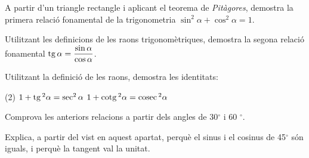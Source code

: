 \begin{mylist}
	\exer
	A partir d'un triangle rectangle i aplicant el teorema de \emph{Pitàgores}, demostra la primera relació fonamental de la trigonometria $\sin^2 \alpha + \cos^2 \alpha = 1$.
	
 	
	\exer
	Utilitzant les definicions de les raons trigonomètriques, demostra la
	segona relació fonamental $\mathrm{tg}\, \alpha = \dfrac{\sin \alpha}{\cos \alpha}$.
	
	\exer
	Utilitzant la definició de les raons, demostra les identitats:
	\begin{tasks}(2)
		\task $1+\mathrm{tg}\,^2 \alpha = \sec^2 \alpha$
		\task $1+\mathrm{cotg}\,^2 \alpha = \mathrm{cosec}\,^2 \alpha$
	\end{tasks}
	
	Comprova les anteriors relacions a partir dels angles de
	30${}^\circ$ i 60 ${}^\circ$.
	
	\exer
	Explica, a partir del vist en aquest apartat, perquè el sinus i el
	cosinus de 45${}^\circ$ són iguals, i perquè la tangent val
	la unitat.
\end{mylist}

